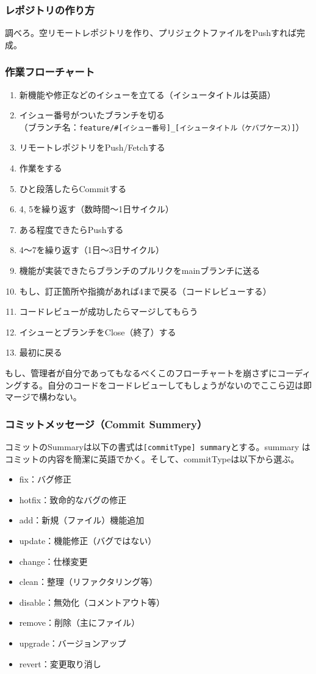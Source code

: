 \documentclass[dvipdfmx,jb5]{jarticle}
\begin{document}
\subsubsection{レポジトリの作り方}
調べろ。空リモートレポジトリを作り、プリジェクトファイルをPushすれば完成。
\subsubsection{作業フローチャート}
 \begin{enumerate}
 \item 新機能や修正などのイシューを立てる（イシュータイトルは英語）
 \item イシュー番号がついたブランチを切る\\
 （ブランチ名：\verb|feature/#[イシュー番号]_[イシュータイトル（ケバブケース）]|）
 \item リモートレポジトリをPush/Fetchする
 \item 作業をする
 \item ひと段落したらCommitする
 \item 4, 5を繰り返す（数時間〜1日サイクル）
 \item ある程度できたらPushする
 \item 4〜7を繰り返す（1日〜3日サイクル）
 \item 機能が実装できたらブランチのプルリクをmainブランチに送る
 \item もし、訂正箇所や指摘があれば4まで戻る（コードレビューする）
 \item コードレビューが成功したらマージしてもらう
 \item イシューとブランチをClose（終了）する
 \item 最初に戻る
 \end{enumerate}
 もし、管理者が自分であってもなるべくこのフローチャートを崩さずにコーディングする。自分のコードをコードレビューしてもしょうがないのでここら辺は即マージで構わない。
 \subsubsection{コミットメッセージ（Commit Summery）}
 コミットのSummaryは以下の書式は\verb|[commitType] summary|とする。summary はコミットの内容を簡潔に英語でかく。そして、commitTypeは以下から選ぶ。

\begin{itemize}
\item fix：バグ修正　
\item hotfix：致命的なバグの修正
\item add：新規（ファイル）機能追加
\item update：機能修正（バグではない）
\item change：仕様変更
\item clean：整理（リファクタリング等）
\item disable：無効化（コメントアウト等）
\item remove：削除（主にファイル）
\item upgrade：バージョンアップ
\item revert：変更取り消し
\end{itemize}
\end{document}
